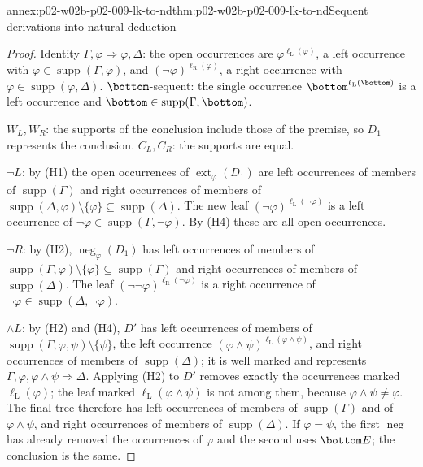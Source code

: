 \begin{annexitem}{annex:p02-w02b-p02-009-lk-to-nd}{thm:p02-w02b-p02-009-lk-to-nd}{Sequent derivations into natural deduction}
\begin{proof}
Identity \(\Gamma,\varphi\Rightarrow\varphi,\Delta\): the open occurrences
are \(\varphi^{\ell_{\mathrm L}(\varphi)}\), a left occurrence with
\(\varphi\in\operatorname{supp}(\Gamma,\varphi)\), and
\((\neg\varphi)^{\ell_{\mathrm R}(\varphi)}\), a right occurrence with
\(\varphi\in\operatorname{supp}(\varphi,\Delta)\).  \(\bottom\)-sequent: the
single occurrence \(\bottom^{\ell_{\mathrm L}(\bottom)}\) is a left occurrence
and \(\bottom\in\operatorname{supp}(\Gamma,\bottom)\).

\(W_L,W_R\): the supports of the conclusion include those of the premise, so
\(D_1\) represents the conclusion.  \(C_L,C_R\): the supports are equal.

\(\neg L\): by (H1) the open occurrences of
\(\operatorname{ext}_\varphi(D_1)\) are left occurrences of members of
\(\operatorname{supp}(\Gamma)\) and right occurrences of members of
\(\operatorname{supp}(\Delta,\varphi)\setminus\{\varphi\}\subseteq
\operatorname{supp}(\Delta)\).  The new leaf
\((\neg\varphi)^{\ell_{\mathrm L}(\neg\varphi)}\) is a left occurrence of
\(\neg\varphi\in\operatorname{supp}(\Gamma,\neg\varphi)\).  By (H4) these are
all open occurrences.

\(\neg R\): by (H2), \(\operatorname{neg}_\varphi(D_1)\) has left occurrences
of members of \(\operatorname{supp}(\Gamma,\varphi)\setminus\{\varphi\}
\subseteq\operatorname{supp}(\Gamma)\) and right occurrences of members of
\(\operatorname{supp}(\Delta)\).  The leaf
\((\neg\neg\varphi)^{\ell_{\mathrm R}(\neg\varphi)}\) is a right occurrence of
\(\neg\varphi\in\operatorname{supp}(\Delta,\neg\varphi)\).

\(\land L\): by (H2) and (H4), \(D'\) has left occurrences of members of
\(\operatorname{supp}(\Gamma,\varphi,\psi)\setminus\{\psi\}\), the left
occurrence \((\varphi\land\psi)^{\ell_{\mathrm L}(\varphi\land\psi)}\), and
right occurrences of members of \(\operatorname{supp}(\Delta)\); it is well
marked and represents \(\Gamma,\varphi,\varphi\land\psi\Rightarrow\Delta\).
Applying (H2) to \(D'\) removes exactly the occurrences marked
\(\ell_{\mathrm L}(\varphi)\); the leaf marked
\(\ell_{\mathrm L}(\varphi\land\psi)\) is not among them, because
\(\varphi\land\psi\neq\varphi\).  The final tree therefore has left
occurrences of members of \(\operatorname{supp}(\Gamma)\) and of
\(\varphi\land\psi\), and right occurrences of members of
\(\operatorname{supp}(\Delta)\).  If \(\varphi=\psi\), the first
\(\operatorname{neg}\) has already removed the occurrences of \(\varphi\) and
the second uses \(\bottom E\); the conclusion is the same.


\end{proof}
\end{annexitem}
